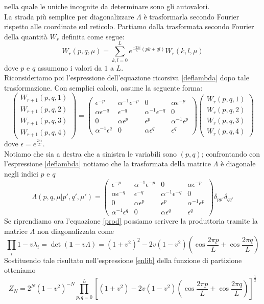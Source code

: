 \documentclass[11pt]{article}
\DeclareMathOperator{\Det}{det}
\begin{document}
nella quale le uniche incognite da determinare sono gli autovalori.\\
La strada più semplice per diagonalizzare $\Lambda$ è trasformarla secondo Fourier rispetto alle coordinate sul reticolo. Partiamo dalla trasformata secondo Fourier della quantità $W_r$ definita come segue:
\begin{equation}\label{trasformata}
W_r(p,q,\mu)=\sum_{k,l=0}^L e^{\frac{-2\pi i}{L}(pk+ql)}W_r(k,l,\mu)
\end{equation} 
dove $p$ e $q$ assumono i valori da $1$ a $L$.\\
Riconsideriamo poi l'espressione dell'equazione ricorsiva \ref{deflambda} dopo tale trasformazione.
Con semplici calcoli, assume la seguente forma:
$$
\left( \begin{array}{c}
W_{r+1}(p,q,1) \\
W_{r+1}(p,q,2)  \\
W_{r+1}(p,q,3) \\
W_{r+1}(p,q,4) \end{array} \right)=
\left( \begin{array}{cccc}
\epsilon^{-p} & \alpha^{-1}\epsilon^{-p} & 0 & \alpha\epsilon^{-p} \\
\alpha\epsilon^{-q} & \epsilon^{-q} & \alpha^{-1}\epsilon^{-q} & 0\\
0 & \alpha\epsilon^p & \epsilon^p & \alpha^{-1}\epsilon^p \\
\alpha^{-1}\epsilon^q & 0 &\alpha\epsilon^q & \epsilon^q \end{array} \right)
\left( \begin{array}{c}
W_{r}(p,q,1) \\
W_{r}(p,q,2)  \\
W_{r}(p,q,3) \\
W_{r}(p,q,4) \end{array} \right)
$$
dove $\epsilon=e^{\frac{2\pi i}{L}}$.\\
Notiamo che sia a destra che a sinistra le variabili sono $(p,q)$; confrontando con l'espressione \ref{deflambda} notiamo che la trasformata della matrice $\Lambda$ è diagonale negli indici $p$ e $q$
$$\Lambda(p,q,\mu | p',q',\mu')= \left(  \begin{array}{cccc}
\epsilon^{-p} & \alpha^{-1}\epsilon^{-p} & 0 & \alpha\epsilon^{-p} \\
\alpha\epsilon^{-q} & \epsilon^{-q} & \alpha^{-1}\epsilon^{-q} & 0\\
0 & \alpha\epsilon^p & \epsilon^p & \alpha^{-1}\epsilon^p \\
\alpha^{-1}\epsilon^q & 0 &\alpha\epsilon^q & \epsilon^q \end{array} \right)\delta_{pp'}\delta_{qq'}
$$
Se riprendiamo ora l'equazione \ref{prod} possiamo scrivere la produttoria tramite la matrice $\Lambda$ non diagonalizzata come
$$
\prod_i1-v\lambda_i=\Det(\textbf{1}-v\Lambda)=(1+v^2)^2-2v(1-v^2) \left( \cos{\frac{2\pi p}{L}}+\cos{\frac{2\pi q}{L}} \right)
$$
Sostituendo tale risultato nell'espressione \ref{enlib} della funzione di partizione otteniamo
$$
Z_N=2^N(1-v^2)^{-N}\prod_{p,q=0}^L \left[ (1+v^2)-2v(1-v^2) \left( \cos{\frac{2\pi p}{L}}+\cos{\frac{2\pi q}{L}} \right) \right]^{\frac{1}{2}}
$$ 
\end{document}
